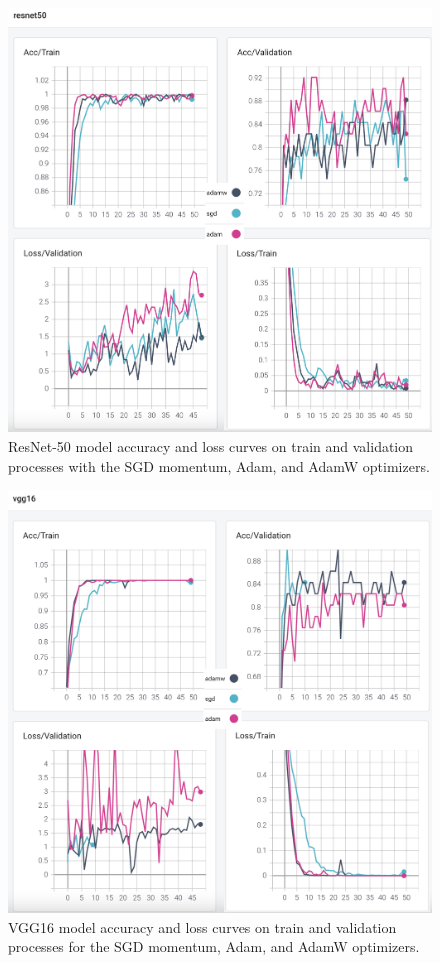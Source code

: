\begin{figure}[!h]
    \centering
    \includegraphics[width=\linewidth]{fig/resnet50.png}
    \vspace{2mm}
    \caption{ResNet-50 model accuracy and loss curves on train and validation processes with the SGD momentum, Adam, and AdamW optimizers.}
    \label{fig:resnet50_plots}
\end{figure}

\begin{figure}[!h]
    \centering
    \includegraphics[width=\linewidth]{fig/vgg16.png}
    \vspace{2mm}
    \caption{VGG16 model accuracy and loss curves on train and validation processes for the SGD momentum, Adam, and AdamW optimizers.}
    \label{fig:vgg16_plots}
\end{figure}

